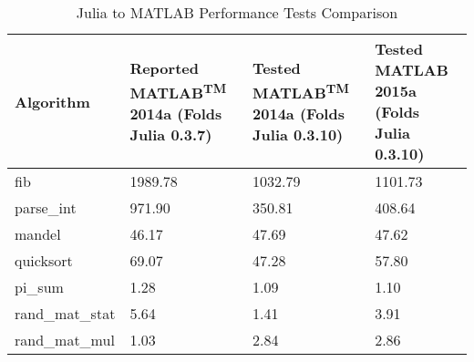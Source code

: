 \begin{table} 
    \begin{tabular}{LLLL}
    \hline
        \textbf{Algorithm} & \textbf{Reported MATLAB\textsuperscript{TM} 2014a (Folds Julia 0.3.7)} & \textbf{Tested MATLAB\textsuperscript{TM} 2014a (Folds Julia 0.3.10)} & \textbf{Tested MATLAB 2015a (Folds Julia 0.3.10)} \\
        \hline
        fib & 1989.78 & 1032.79 & 1101.73 \\ 
        \hline
        parse\_int & 971.90 & 350.81 & 408.64 \\ 
        \hline
        mandel & 46.17 & 47.69 & 47.62 \\ 
        \hline
        quicksort & 69.07 & 47.28 & 57.80 \\ 
        \hline
        pi\_sum & 1.28 & 1.09 & 1.10 \\ 
        \hline
        rand\_mat\_stat & 5.64 & 1.41 & 3.91 \\ 
        \hline
        rand\_mat\_mul & 1.03 & 2.84 & 2.86 \\ 
    \end{tabular}
    \caption{Julia to MATLAB Performance Tests Comparison}
\end{table}

  
  
  
  
  
  
  
  
  
  
  
  
  
  
  
  
  
  
  
  
  
  
  
  
  
  
  
  
  
  
  
  
  
  
  
  
  
  
